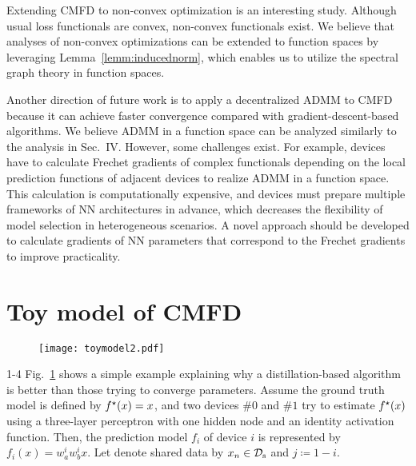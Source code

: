 \documentclass[journal]{IEEEtran}
\begin{document}
Extending \gls{CMFD} to non-convex optimization is an interesting study.
Although usual loss functionals are convex, non-convex functionals exist.
We believe that analyses of non-convex optimizations \cite{sun2020improving,lu2020decentralized} can be extended to function spaces
by leveraging Lemma~\ref{lemm:inducednorm}, which enables us to utilize the spectral graph theory in function spaces.

Another direction of future work is to apply a decentralized \gls{ADMM} to \gls{CMFD}
because it can achieve faster convergence compared with gradient-descent-based algorithms.
We believe \gls{ADMM} in a function space can be analyzed similarly to the analysis in Sec.~IV.
However, some challenges exist.
For example, devices have to calculate \gls{Frechet} gradients of complex functionals
depending on the local prediction functions of adjacent devices
to realize \gls{ADMM} in a function space.
This calculation is computationally expensive,
and devices must prepare multiple frameworks of \gls{NN} architectures in advance,
which decreases the flexibility of model selection in heterogeneous scenarios.
A novel approach should be developed to calculate gradients of \gls{NN} parameters that correspond to the \gls{Frechet} gradients
to improve practicality.

\appendices
\section{Toy model of \gls{CMFD}} \label{sec:app_toymodel}

\begin{figure}[!t]
\centering
\texttt{[image: toymodel2.pdf]}
\caption{
}
\label{fig:toymodel}
\end{figure}

\begin{revhl}{1-4}
Fig.~\ref{fig:toymodel} shows a simple example explaining
why a distillation-based algorithm is better than those trying to converge parameters.
Assume the ground truth model is defined by $f^\star(x) = x$,
and two devices $\#0$ and $\#1$ try to estimate $f^\star(x)$
using a three-layer perceptron with one hidden node and an identity activation function.
Then, the prediction model $f_i$ of device $i$ is represented by $f_i(x) = w_a^i w_b^i x$.
Let denote shared data by $x_n \in \mathcal{D}_\mathrm{s}$ and $j\coloneqq 1-i$.
\end{revhl}
\end{document}
